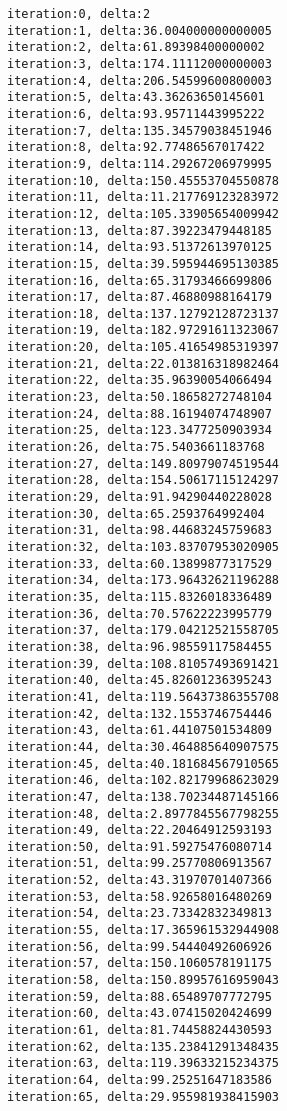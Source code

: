 \documentclass[11pt]{article}
\begin{document}
    \begin{Verbatim}[commandchars=\\\{\}]
iteration:0, delta:2
iteration:1, delta:36.004000000000005
iteration:2, delta:61.89398400000002
iteration:3, delta:174.11112000000003
iteration:4, delta:206.54599600800003
iteration:5, delta:43.36263650145601
iteration:6, delta:93.95711443995222
iteration:7, delta:135.34579038451946
iteration:8, delta:92.77486567017422
iteration:9, delta:114.29267206979995
iteration:10, delta:150.45553704550878
iteration:11, delta:11.217769123283972
iteration:12, delta:105.33905654009942
iteration:13, delta:87.39223479448185
iteration:14, delta:93.51372613970125
iteration:15, delta:39.595944695130385
iteration:16, delta:65.31793466699806
iteration:17, delta:87.46880988164179
iteration:18, delta:137.12792128723137
iteration:19, delta:182.97291611323067
iteration:20, delta:105.41654985319397
iteration:21, delta:22.013816318982464
iteration:22, delta:35.96390054066494
iteration:23, delta:50.18658272748104
iteration:24, delta:88.16194074748907
iteration:25, delta:123.3477250903934
iteration:26, delta:75.5403661183768
iteration:27, delta:149.80979074519544
iteration:28, delta:154.50617115124297
iteration:29, delta:91.94290440228028
iteration:30, delta:65.2593764992404
iteration:31, delta:98.44683245759683
iteration:32, delta:103.83707953020905
iteration:33, delta:60.13899877317529
iteration:34, delta:173.96432621196288
iteration:35, delta:115.8326018336489
iteration:36, delta:70.57622223995779
iteration:37, delta:179.04212521558705
iteration:38, delta:96.98559117584455
iteration:39, delta:108.81057493691421
iteration:40, delta:45.82601236395243
iteration:41, delta:119.56437386355708
iteration:42, delta:132.1553746754446
iteration:43, delta:61.44107501534809
iteration:44, delta:30.464885640907575
iteration:45, delta:40.181684567910565
iteration:46, delta:102.82179968623029
iteration:47, delta:138.70234487145166
iteration:48, delta:2.8977845567798255
iteration:49, delta:22.20464912593193
iteration:50, delta:91.59275476080714
iteration:51, delta:99.25770806913567
iteration:52, delta:43.31970701407366
iteration:53, delta:58.92658016480269
iteration:54, delta:23.73342832349813
iteration:55, delta:17.365961532944908
iteration:56, delta:99.54440492606926
iteration:57, delta:150.1060578191175
iteration:58, delta:150.89957616959043
iteration:59, delta:88.65489707772795
iteration:60, delta:43.07415020424699
iteration:61, delta:81.74458824430593
iteration:62, delta:135.23841291348435
iteration:63, delta:119.39633215234375
iteration:64, delta:99.25251647183586
iteration:65, delta:29.955981938415903

\end{Verbatim}
\end{document}
